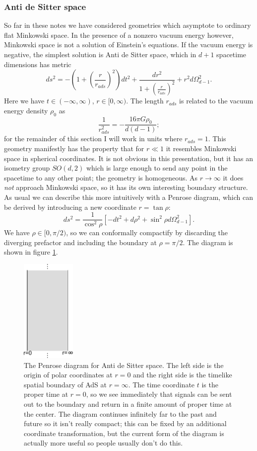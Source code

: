 \documentclass[12pt]{article}
\newcommand{\be}{\begin{equation}}
\newcommand{\ee}{\end{equation}}
\begin{document}
\subsubsection{Anti de Sitter space}
So far in these notes we have considered geometries which asymptote to ordinary flat Minkowski space.  In the presence of a nonzero vacuum energy however, Minkowski space is not a solution of Einstein's equations.  If the vacuum energy is negative, the simplest solution is Anti de Sitter space, which in $d+1$ spacetime dimensions has metric
\be\label{adsmetric}
ds^2=-\left(1+\left(\frac{r}{r_{ads}}\right)^2\right)dt^2+\frac{dr^2}{1+\left(\frac{r}{r_{ads}}\right)^2}+r^2d\Omega_{d-1}^2.
\ee
Here we have $t\in (-\infty,\infty)$, $r\in [0,\infty)$.  The length $r_{ads}$ is related to the vacuum energy density $\rho_0$ as
\be
\frac{1}{r_{ads}^2}=-\frac{16\pi G \rho_0}{d(d-1)};
\ee
for the remainder of this section I will work in units where $r_{ads}=1$.  This geometry manifestly has the property that for $r\ll 1$ it resembles Minkowski space in spherical coordinates.  It is not obvious in this presentation, but it has an isometry group $SO(d,2)$ which is large enough to send any point in the spacetime to any other point; the geometry is homogeneous.  As $r\to \infty$ it does \textit{not} approach Minkowski space, so it has its own interesting boundary structure.  As usual we can describe this more intuitively with a Penrose diagram, which can be derived by introducing a new coordinate $r=\tan \rho$:
\be
ds^2=\frac{1}{\cos^2 \rho}\left[-dt^2+d\rho^2+\sin^2\rho d\Omega_{d-1}^2\right].
\ee
We have $\rho\in [0,\pi/2)$, so we can conformally compactify by discarding the diverging prefactor and including the boundary at $\rho=\pi/2$.  The diagram is shown in figure \ref{adspen}.
\begin{figure}
\begin{center}
\includegraphics[height=5cm]{adspen.pdf}
\caption{The Penrose diagram for Anti de Sitter space.  The left side is the origin of polar coordinates at $r=0$ and the right side is the timelike spatial boundary of AdS at $r=\infty$.  The time coordinate $t$ is the proper time at $r=0$, so we see immediately that signals can be sent out to the boundary and return in a finite amount of proper time at the center.  The diagram continues infinitely far to the past and future so it isn't really compact; this can be fixed by an additional coordinate transformation, but the current form of the diagram is actually more useful so people usually don't do this.}\label{adspen}
\end{center}
\end{figure}
\end{document}
